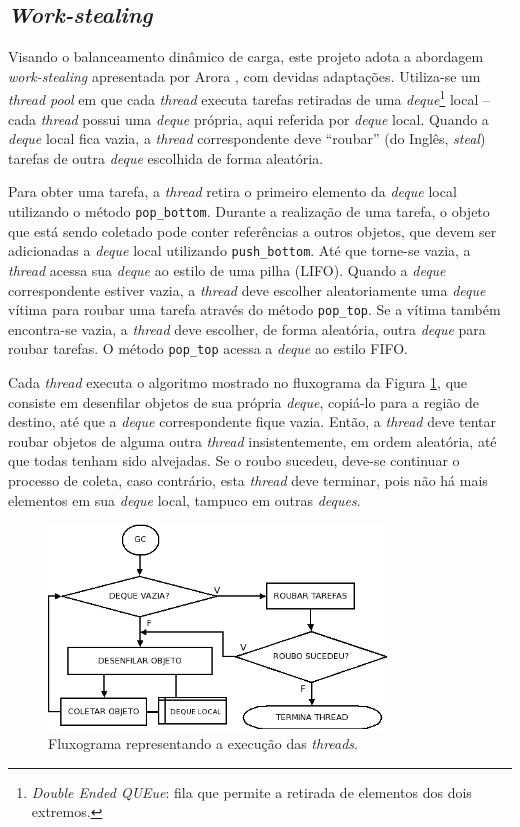 \documentclass[ccc, pg2]{esinucpel}
\begin{document}
\subsection{\textit{Work-stealing}} \label{sec:worksteal}
Visando o balanceamento dinâmico de carga, este projeto adota a abordagem \textit{work-stealing} apresentada por Arora \cite{bib:arora:worksteal}, com devidas adaptações. Utiliza-se um \textit{thread pool} em que cada \textit{thread} executa tarefas retiradas de uma {\it deque}\footnote{\textit{Double Ended QUEue}: fila que permite a retirada de elementos dos dois extremos.} local -- cada {\it thread} possui uma {\it deque} própria, aqui referida por {\it deque} local. Quando a {\it deque} local fica vazia, a \textit{thread} correspondente deve ``roubar'' (do Inglês, \textit{steal}) tarefas de outra {\it deque} escolhida de forma aleatória.

Para obter uma tarefa, a \textit{thread} retira o primeiro elemento da {\it deque} local utilizando o método \texttt{pop\_bottom}. Durante a realização de uma tarefa, o objeto que está sendo coletado pode conter referências a outros objetos, que devem ser adicionadas a {\it deque} local utilizando \texttt{push\_bottom}. Até que torne-se vazia, a \textit{thread} acessa sua {\it deque} ao estilo de uma pilha (LIFO). Quando a {\it deque} correspondente estiver vazia, a \textit{thread} deve escolher aleatoriamente uma {\it deque} vítima para roubar uma tarefa através do método \texttt{pop\_top}. Se a vítima também encontra-se vazia, a \textit{thread} deve escolher, de forma aleatória, outra {\it deque} para roubar tarefas. O método \texttt{pop\_top} acessa a {\it deque} ao estilo FIFO.

Cada {\it thread} executa o algoritmo mostrado no fluxograma da Figura \ref{fig:flow2}, que consiste em desenfilar objetos de sua própria {\it deque}, copiá-lo para a região de destino, até que a {\it deque} correspondente fique vazia. Então, a {\it thread} deve tentar roubar objetos de alguma outra {\it thread} insistentemente, em ordem aleatória, até que todas tenham sido alvejadas. Se o roubo sucedeu, deve-se continuar o processo de coleta, caso contrário, esta {\it thread} deve terminar, pois não há mais elementos em sua {\it deque} local, tampuco em outras {\it deques}.

\begin{figure}[h]
\centering
\includegraphics[width=0.8\textwidth]{images/gc_flow22.png}
\caption{Fluxograma representando a execução das {\it threads}.}
\label{fig:flow2}
\end{figure}
\end{document}
